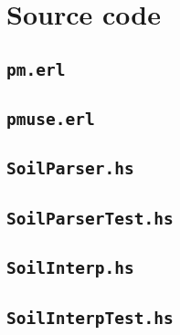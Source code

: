
\section{Source code}

\subsection{\texttt{pm.erl}}


\subsection{\texttt{pmuse.erl}}


\subsection{\texttt{SoilParser.hs}}
\label{source:parser}


\subsection{\texttt{SoilParserTest.hs}}


\subsection{\texttt{SoilInterp.hs}}


\subsection{\texttt{SoilInterpTest.hs}}

